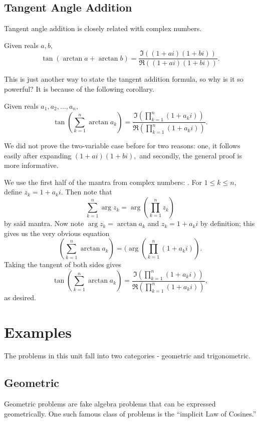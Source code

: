 \documentclass{article}
\begin{document}
\subsection{Tangent Angle Addition}

Tangent angle addition is closely related with complex numbers.

\begin{theo}
Given reals $a,b,$
\[\tan(\arctan a + \arctan b)=\frac{\Im\left((1+ai)(1+bi)\right)}{\Re\left((1+ai)(1+bi)\right)}.\]
\end{theo}

This is just another way to state the tangent addition formula, so why is it so powerful? It is because of the following corollary.

\begin{corollary}
Given reals $a_1,a_2,\ldots,a_n,$
\[\tan\left(\sum_{k=1}^n \arctan a_k\right) = \frac{\Im\left(\prod\limits_{k=1}^n (1+a_ki)\right)}{\Re\left(\prod\limits_{k=1}^n (1+a_ki)\right)}.\]
\end{corollary}

We did not prove the two-variable case before for two reasons: one, it follows easily after expanding $(1+ai)(1+bi),$ and secondly, the general proof is more informative.

\begin{pro}
We use the first half of the mantra from complex numbers: . For $1\leq k\leq n,$ define $z_k=1+a_ki.$ Then note that
\[\sum_{k=1}^n\arg z_k=\arg\left(\prod\limits_{k=1}^n z_k\right)\]
by said mantra. Now note $\arg z_k=\arctan a_k$ and $z_k=1+a_ki$ by definition; this gives us the very obvious equation
\[\left(\sum_{k=1}^n \arctan a_k\right) = (\arg\left(\prod\limits_{k=1}^n (1+a_ki)\right).\]
Taking the tangent of both sides gives
\[\tan\left(\sum_{k=1}^n \arctan a_k\right) = \frac{\Im\left(\prod\limits_{k=1}^n (1+a_ki)\right)}{\Re\left(\prod\limits_{k=1}^n (1+a_ki)\right)},\]
as desired.
\end{pro}

\pagebreak

\section{Examples}
The problems in this unit fall into two categories - geometric and trigonometric.

\subsection{Geometric}
Geometric problems are fake algebra problems that can be expressed geometrically. One such famous class of problems is the ``implicit Law of Cosines.''
\end{document}
